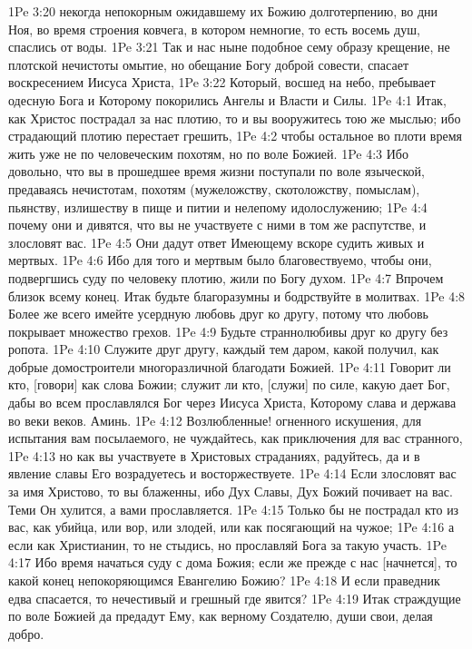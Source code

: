 1Pe 3:20  некогда непокорным ожидавшему их Божию долготерпению, во дни Ноя, во время строения ковчега, в котором немногие, то есть восемь душ, спаслись от воды.
1Pe 3:21  Так и нас ныне подобное сему образу крещение, не плотской нечистоты омытие, но обещание Богу доброй совести, спасает воскресением Иисуса Христа,
1Pe 3:22  Который, восшед на небо, пребывает одесную Бога и Которому покорились Ангелы и Власти и Силы.
1Pe 4:1  Итак, как Христос пострадал за нас плотию, то и вы вооружитесь тою же мыслью; ибо страдающий плотию перестает грешить,
1Pe 4:2  чтобы остальное во плоти время жить уже не по человеческим похотям, но по воле Божией.
1Pe 4:3  Ибо довольно, что вы в прошедшее время жизни поступали по воле языческой, предаваясь нечистотам, похотям (мужеложству, скотоложству, помыслам), пьянству, излишеству в пище и питии и нелепому идолослужению;
1Pe 4:4  почему они и дивятся, что вы не участвуете с ними в том же распутстве, и злословят вас.
1Pe 4:5  Они дадут ответ Имеющему вскоре судить живых и мертвых.
1Pe 4:6  Ибо для того и мертвым было благовествуемо, чтобы они, подвергшись суду по человеку плотию, жили по Богу духом.
1Pe 4:7  Впрочем близок всему конец. Итак будьте благоразумны и бодрствуйте в молитвах.
1Pe 4:8  Более же всего имейте усердную любовь друг ко другу, потому что любовь покрывает множество грехов.
1Pe 4:9  Будьте страннолюбивы друг ко другу без ропота.
1Pe 4:10  Служите друг другу, каждый тем даром, какой получил, как добрые домостроители многоразличной благодати Божией.
1Pe 4:11  Говорит ли кто, [говори] как слова Божии; служит ли кто, [служи] по силе, какую дает Бог, дабы во всем прославлялся Бог через Иисуса Христа, Которому слава и держава во веки веков. Аминь.
1Pe 4:12  Возлюбленные! огненного искушения, для испытания вам посылаемого, не чуждайтесь, как приключения для вас странного,
1Pe 4:13  но как вы участвуете в Христовых страданиях, радуйтесь, да и в явление славы Его возрадуетесь и восторжествуете.
1Pe 4:14  Если злословят вас за имя Христово, то вы блаженны, ибо Дух Славы, Дух Божий почивает на вас. Теми Он хулится, а вами прославляется.
1Pe 4:15  Только бы не пострадал кто из вас, как убийца, или вор, или злодей, или как посягающий на чужое;
1Pe 4:16  а если как Христианин, то не стыдись, но прославляй Бога за такую участь.
1Pe 4:17  Ибо время начаться суду с дома Божия; если же прежде с нас [начнется], то какой конец непокоряющимся Евангелию Божию?
1Pe 4:18  И если праведник едва спасается, то нечестивый и грешный где явится?
1Pe 4:19  Итак страждущие по воле Божией да предадут Ему, как верному Создателю, души свои, делая добро.
